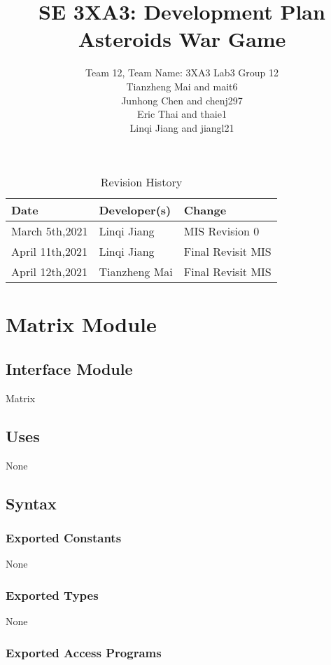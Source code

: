 \documentclass[12pt]{article}
\title{SE 3XA3: Development Plan\\Asteroids War Game}
\author{Team 12, Team Name: 3XA3 Lab3 Group 12
		\\ Tianzheng Mai and mait6
		\\ Junhong Chen and chenj297
		\\ Eric Thai and thaie1
		\\ Linqi Jiang and jiangl21
}
\date{}
\begin{document}
\maketitle
\begin{table}[hp]
\caption{Revision History} \label{TblRevisionHistory}
\begin{tabularx}{\textwidth}{llX}
\toprule
\textbf{Date} & \textbf{Developer(s)} & \textbf{Change}\\
\midrule
March 5th,2021 & Linqi Jiang & MIS Revision 0\\
April 11th,2021 & Linqi Jiang & Final Revisit MIS\\
April 12th,2021 & Tianzheng Mai & Final Revisit MIS\\
\bottomrule
\end{tabularx}
\end{table}

\newpage

\section* {Matrix Module}

\subsection*{Interface Module}

Matrix

\subsection* {Uses}

None

\subsection* {Syntax}

\subsubsection* {Exported Constants}

None

\subsubsection* {Exported Types}

None 

\subsubsection* {Exported Access Programs}
\end{document}
